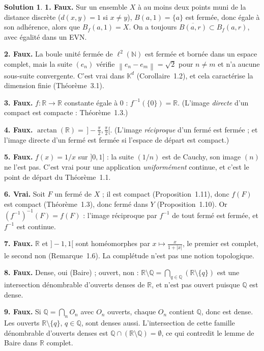 \documentclass[11pt,a4paper]{article}
\newcommand{\R}{\mathbb{R}}
\newcommand{\N}{\mathbb{N}}
\newcommand{\Q}{\mathbb{Q}}
\newcommand{\adh}[1]{\overline{#1}}
\newcommand{\Bf}{B_f}
\newcommand{\norm}[1]{\left\|#1\right\|}
\newcommand{\K}{\mathbb{K}}
\theoremstyle{definition}
\newtheorem*{solution}{Solution}
\begin{document}
\begin{solution}
\noindent\textbf{1. Faux.} Sur un ensemble $X$ à au moins deux points muni de la distance discrète ($d(x,y)=1$ si $x\ne y$), $B(a,1)=\{a\}$ est fermée, donc égale à son adhérence, alors que $\Bf(a,1)=X$. On a toujours $\adh{B(a,r)}\subset\Bf(a,r)$, avec égalité dans un EVN.

\medskip
\noindent\textbf{2. Faux.} La boule unité fermée de $\ell^2(\N)$ est fermée et bornée dans un espace complet, mais la suite $(e_n)$ vérifie $\norm{e_n-e_m}=\sqrt2$ pour $n\ne m$ et n'a aucune sous-suite convergente. C'est vrai dans $\K^d$ (Corollaire~1.2), et cela caractérise la dimension finie (Théorème~3.1).

\medskip
\noindent\textbf{3. Faux.} $f:\R\to\R$ constante égale à $0$ : $f^{-1}(\{0\})=\R$. (L'image \emph{directe} d'un compact est compacte : Théorème~1.3.)

\medskip
\noindent\textbf{4. Faux.} $\arctan(\R)=\,]-\frac\pi2,\frac\pi2[$. (L'image \emph{réciproque} d'un fermé est fermée ; et l'image directe d'un fermé est fermée si l'espace de départ est compact.)

\medskip
\noindent\textbf{5. Faux.} $f(x)=1/x$ sur $]0,1]$ : la suite $(1/n)$ est de Cauchy, son image $(n)$ ne l'est pas. C'est vrai pour une application \emph{uniformément} continue, et c'est le point de départ du Théorème~1.1.

\medskip
\noindent\textbf{6. Vrai.} Soit $F$ un fermé de $X$ ; il est compact (Proposition~1.11), donc $f(F)$ est compact (Théorème~1.3), donc fermé dans $Y$ (Proposition~1.10). Or $(f^{-1})^{-1}(F)=f(F)$ : l'image réciproque par $f^{-1}$ de tout fermé est fermée, et $f^{-1}$ est continue.

\medskip
\noindent\textbf{7. Faux.} $\R$ et $]-1,1[$ sont homéomorphes par $x\mapsto\frac x{1+|x|}$, le premier est complet, le second non (Remarque~1.6). La complétude n'est pas une notion topologique.

\medskip
\noindent\textbf{8. Faux.} Dense, oui (Baire) ; ouvert, non : $\R\setminus\Q=\bigcap_{q\in\Q}(\R\setminus\{q\})$ est une intersection dénombrable d'ouverts denses de $\R$, et n'est pas ouvert puisque $\Q$ est dense.

\medskip
\noindent\textbf{9. Faux.} Si $\Q=\bigcap_nO_n$ avec $O_n$ ouverts, chaque $O_n$ contient $\Q$, donc est dense. Les ouverts $\R\setminus\{q\}$, $q\in\Q$, sont denses aussi. L'intersection de cette famille dénombrable d'ouverts denses est $\Q\cap(\R\setminus\Q)=\emptyset$, ce qui contredit le lemme de Baire dans $\R$ complet.


\end{solution}
\end{document}
